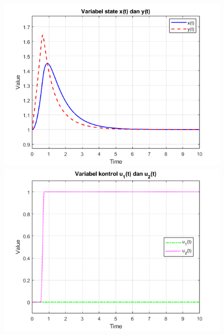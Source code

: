 \documentclass{article}
\begin{document}
\begin{enumerate}[label=\alph*.]
\begin{figure}[h!] 
    \centering
    \includegraphics[width=0.45\linewidth]{EAS Nomor 2 x y.png}
    \includegraphics[width=0.45\linewidth]{EAS Nomor 2 u1 u2.png}
\end{figure}
    
\end{enumerate}
\end{document}
